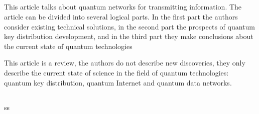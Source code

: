 \subsection{\review}
This article talks about quantum networks for transmitting information. The article can be divided into several logical parts.  In the first part the authors consider existing technical solutions, in the second part the prospects of quantum key distribution development, and in the third part they make conclusions about the current state of quantum technologies

This article is a review, the authors do not describe new discoveries, they only describe the current state of science in the field of quantum technologies: quantum key distribution, quantum Internet and quantum data networks.

\subsection{\dic}
ss